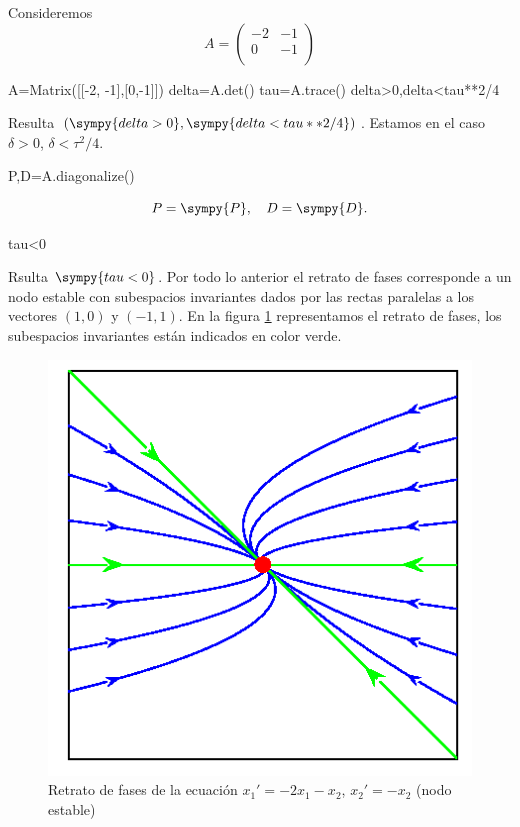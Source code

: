 \begin{ejemplo}{} Consideremos
\[A=
\begin{pmatrix}-2 & -1\\0 & -1\\
 \end{pmatrix}
\]
 

\begin{sympyblock}[][numbers=left,frame=single,framesep=5mm]
A=Matrix([[-2, -1],[0,-1]])
delta=A.det()
tau=A.trace()
delta>0,delta<tau**2/4
\end{sympyblock}
Resulta $(\sympy{delta>0},\sympy{delta<tau**2/4})$. Estamos en el caso $\delta>0$, $\delta<\tau^2/4$. 
\begin{sympyblock}[][numbers=left,frame=single,framesep=5mm]
P,D=A.diagonalize()
\end{sympyblock}

\[
 P=\sympy{P},\quad D=\sympy{D}.
\]

\begin{sympyblock}[][numbers=left,frame=single,framesep=5mm]
tau<0
\end{sympyblock}
Rsulta $\sympy{tau<0}$.  Por todo lo anterior el retrato de fases corresponde a un nodo estable con subespacios invariantes dados por las rectas paralelas a los vectores $(1,0)$ y $(-1,1)$. En la figura \ref{fig:nodo_est_nodiag} representamos el retrato de fases, los subespacios invariantes están indicados en color verde.

\begin{figure}[h]
\begin{center}
\includegraphics[scale=.5]{imagenes/nodo_est_nodiag.png}
\end{center}
\caption{Retrato de fases de la ecuación $x_1'=-2x_1-x_2$,
$x_2'=-x_2$ (nodo estable)}\label{fig:nodo_est_nodiag}

\end{figure}

\end{ejemplo}



